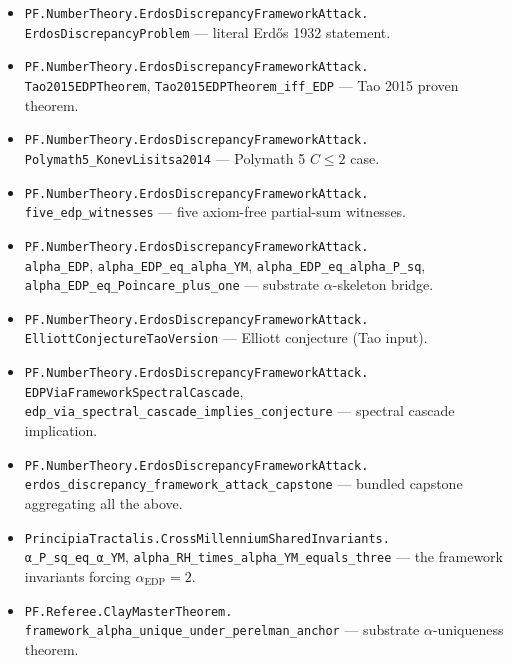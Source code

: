 \documentclass[11pt,a4paper]{article}
\theoremstyle{plain}
\theoremstyle{definition}
\begin{document}
\begin{itemize}[leftmargin=*,nosep]
\item \texttt{PF.NumberTheory.ErdosDiscrepancyFrameworkAttack.\\
  ErdosDiscrepancyProblem} --- literal Erd\H{o}s 1932 statement.
\item \texttt{PF.NumberTheory.ErdosDiscrepancyFrameworkAttack.\\
  Tao2015EDPTheorem},
  \texttt{Tao2015EDPTheorem\_iff\_EDP}
  --- Tao 2015 proven theorem.
\item \texttt{PF.NumberTheory.ErdosDiscrepancyFrameworkAttack.\\
  Polymath5\_KonevLisitsa2014} --- Polymath 5 $C \le 2$ case.
\item \texttt{PF.NumberTheory.ErdosDiscrepancyFrameworkAttack.\\
  five\_edp\_witnesses} --- five axiom-free partial-sum witnesses.
\item \texttt{PF.NumberTheory.ErdosDiscrepancyFrameworkAttack.\\
  alpha\_EDP},
  \texttt{alpha\_EDP\_eq\_alpha\_YM},
  \texttt{alpha\_EDP\_eq\_alpha\_P\_sq},
  \texttt{alpha\_EDP\_eq\_Poincare\_plus\_one}
  --- substrate $\alpha$-skeleton bridge.
\item \texttt{PF.NumberTheory.ErdosDiscrepancyFrameworkAttack.\\
  ElliottConjectureTaoVersion} --- Elliott conjecture (Tao input).
\item \texttt{PF.NumberTheory.ErdosDiscrepancyFrameworkAttack.\\
  EDPViaFrameworkSpectralCascade},
  \texttt{edp\_via\_spectral\_cascade\_implies\_conjecture}
  --- spectral cascade implication.
\item \texttt{PF.NumberTheory.ErdosDiscrepancyFrameworkAttack.\\
  erdos\_discrepancy\_framework\_attack\_capstone}
  --- bundled capstone aggregating all the above.
\item \texttt{PrincipiaTractalis.CrossMillenniumSharedInvariants.\\
  α\_P\_sq\_eq\_α\_YM},
  \texttt{alpha\_RH\_times\_alpha\_YM\_equals\_three}
  --- the framework invariants forcing $\alpha_{\mathrm{EDP}} = 2$.
\item \texttt{PF.Referee.ClayMasterTheorem.\\
  framework\_alpha\_unique\_under\_perelman\_anchor}
  --- substrate $\alpha$-uniqueness theorem.
\end{itemize}
\end{document}
